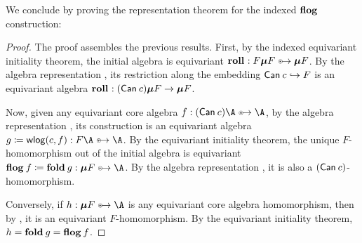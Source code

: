 We conclude by proving the representation theorem for the indexed
$\flg$ construction:
\begin{proof}
  The proof assembles the previous results. First, by the indexed
  equivariant initiality theorem, the initial algebra is equivariant
  $\roll : F\fix F \equito \fix
  F$. By the algebra representation , its restriction along the
  embedding $\mathop{\mathsf{Can}}\nolimits_{}{c} \hookrightarrow F$ is an equivariant algebra
  $\roll : (\Canon\canoniser)\fix F \to \fix
  F$.

  Now, given any equivariant core algebra $f : (\Canon\canoniser) \A
  \equito \A$, by the algebra representation , its \WLOG{} construction is
  an equivariant algebra $g \definedby \wlg(\canoniser, f) :
  F\A \equito \A$.  By the equivariant initiality
  theorem, the unique $F$-homomorphism out of the initial algebra is
  equivariant $\flg f \definedby \fold g : \fix F \equito
  \A$. By the algebra representation , it is also a
  $(\mathop{\mathsf{Can}}\nolimits_{}{c})$-homomorphism.

  Conversely, if $h : \fix F \equito \A$ is any
  equivariant core algebra homomorphism, then by , it is an equivariant
  $F$-homomorphism. By the equivariant initiality
  theorem, $h = \fold g = \flg f$.
\end{proof}
